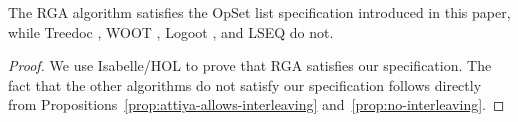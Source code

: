 \begin{proposition}
    The RGA algorithm \cite{Roh:2011dw} satisfies the OpSet list specification introduced in this paper, while Treedoc \cite{Preguica:2009fz}, WOOT \cite{Oster:2006wj}, Logoot \cite{Weiss:2010hx}, and LSEQ \cite{Nedelec:2013ky,Nedelec:2016eo} do not.
\end{proposition}
\begin{proof}
    We use Isabelle/HOL to prove that RGA satisfies our specification.
    The fact that the other algorithms do not satisfy our specification follows directly from Propositions~\ref{prop:attiya-allows-interleaving} and~\ref{prop:no-interleaving}.
\end{proof}
